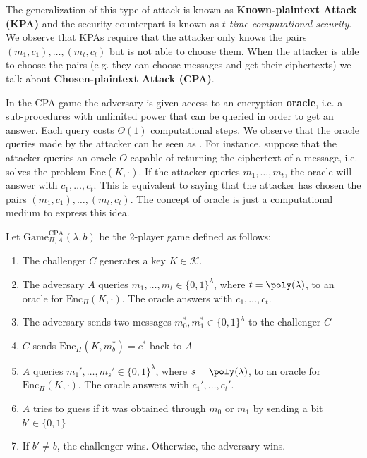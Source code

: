 \documentclass[a4paper, 12pt]{report}
\begin{document}
    The generalization of this type of attack is known as \textbf{Known-plaintext Attack (KPA)} and the security counterpart is known as \textit{$t$-time computational security}. We observe that KPAs require that the attacker only knows the pairs $(m_1, c_1), \ldots, (m_t, c_t)$ but is not able to choose them. When the attacker is able to choose the pairs (e.g. they can choose messages and get their ciphertexts) we talk about \textbf{Chosen-plaintext Attack (CPA)}.
    
    In the CPA game the adversary is given access to an encryption \textbf{oracle}, i.e. a sub-procedures with unlimited power that can be queried in order to get an answer. Each query costs $\Theta(1)$ computational steps. We observe that the oracle queries made by the attacker can be seen as . For instance, suppose that the attacker queries an oracle $O$ capable of returning the ciphertext of a message, i.e. solves the problem $\mathrm{Enc}(K, \cdot)$. If the attacker queries $m_1, \ldots, m_t$, the oracle will answer with $c_1, \ldots, c_t$. This is equivalent to saying that the attacker has chosen the pairs $(m_1, c_1), \ldots, (m_t, c_t)$. The concept of oracle is just a computational medium to express this idea.
    
    Let $\mathrm{Game}_{\Pi,A}^{\text{CPA}}(\lambda,b)$ be the 2-player game defined as follows:
    \begin{enumerate}
        \item The challenger $C$ generates a key $K \in \mathcal{K}$.
        \item The adversary $A$ queries $m_1, \ldots, m_t \in \{0,1\}^\lambda$, where $t = \poly(\lambda)$, to an oracle for $\mathrm{Enc}_{\Pi}(K, \cdot)$. The oracle answers with $c_1, \ldots, c_t$.
        \item The adversary sends two messages $m_0^*, m_1^* \in \{0,1\}^\lambda$ to the challenger $C$
        \item $C$ sends $\mathrm{Enc}_\Pi(K, m^*_b) = c^*$ back to $A$
        \item $A$ queries $m_1', \ldots, m_s' \in \{0,1\}^\lambda$, where $s = \poly(\lambda)$, to an oracle for $\mathrm{Enc}_{\Pi}(K, \cdot)$. The oracle answers with $c_1', \ldots, c_t'$.
        \item $A$ tries to guess if it was obtained through $m_0$ or $m_1$ by sending a bit $b' \in \{0,1\}$
        \item If $b' \neq b$, the challenger wins. Otherwise, the adversary wins. 
    \end{enumerate}
\end{document}
